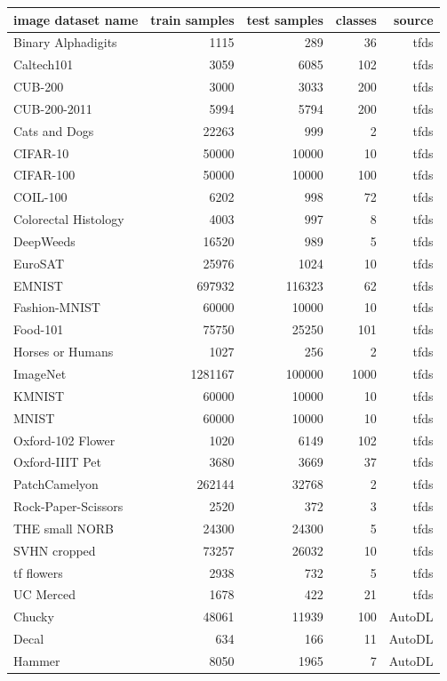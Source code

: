 \documentclass{article}
\begin{document}
\begin{table}
\center
\tiny 
\begin{tabular}{|l|r|r|r|r|}
\hline
image dataset name & train samples & test samples & classes & source \\
\hline
Binary Alphadigits & 1115 & 289 & 36 & tfds \\
Caltech101 & 3059 & 6085 & 102 & tfds \\
CUB-200 & 3000 & 3033 & 200 & tfds \\
CUB-200-2011 & 5994 & 5794 & 200 & tfds \\
Cats and Dogs & 22263 & 999 & 2 & tfds \\
CIFAR-10 & 50000 & 10000 & 10 & tfds \\
CIFAR-100 & 50000 & 10000 & 100 & tfds \\
COIL-100 & 6202 & 998 & 72 & tfds \\
Colorectal Histology & 4003 & 997 & 8 & tfds \\
DeepWeeds & 16520 & 989 & 5 & tfds \\
EuroSAT & 25976 & 1024 & 10 & tfds \\
EMNIST & 697932 & 116323 & 62 & tfds \\
Fashion-MNIST & 60000 & 10000 & 10 & tfds \\
Food-101 & 75750 & 25250 & 101 & tfds \\
Horses or Humans & 1027 & 256 & 2 & tfds \\
ImageNet &  1281167  & 100000 & 1000 & tfds \\
KMNIST & 60000 & 10000 & 10 & tfds \\
MNIST & 60000 & 10000 & 10 & tfds \\
Oxford-102 Flower & 1020 & 6149 & 102 & tfds \\
Oxford-IIIT Pet & 3680 & 3669 & 37 & tfds \\
PatchCamelyon & 262144 & 32768 & 2 & tfds \\
Rock-Paper-Scissors & 2520 & 372 & 3 & tfds \\
THE small NORB & 24300 & 24300 & 5 & tfds \\
SVHN cropped & 73257 & 26032 & 10 & tfds \\
tf flowers & 2938 & 732 & 5 & tfds \\
UC Merced & 1678 & 422 & 21 & tfds \\
Chucky & 48061 & 11939 & 100 & AutoDL \\
Decal & 634 & 166 & 11 & AutoDL \\
Hammer & 8050 & 1965 & 7 & AutoDL \\

\end{tabular}
\end{table}
\end{document}

